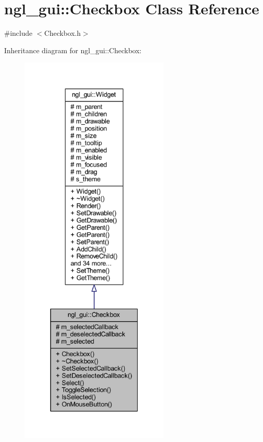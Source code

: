 \hypertarget{classngl__gui_1_1_checkbox}{}\section{ngl\+\_\+gui\+:\+:Checkbox Class Reference}
\label{classngl__gui_1_1_checkbox}


{\ttfamily \#include $<$Checkbox.\+h$>$}



Inheritance diagram for ngl\+\_\+gui\+:\+:Checkbox\+:\nopagebreak
\begin{figure}[H]
\begin{center}
\leavevmode
\includegraphics[height=550pt]{classngl__gui_1_1_checkbox__inherit__graph}
\end{center}
\end{figure}


